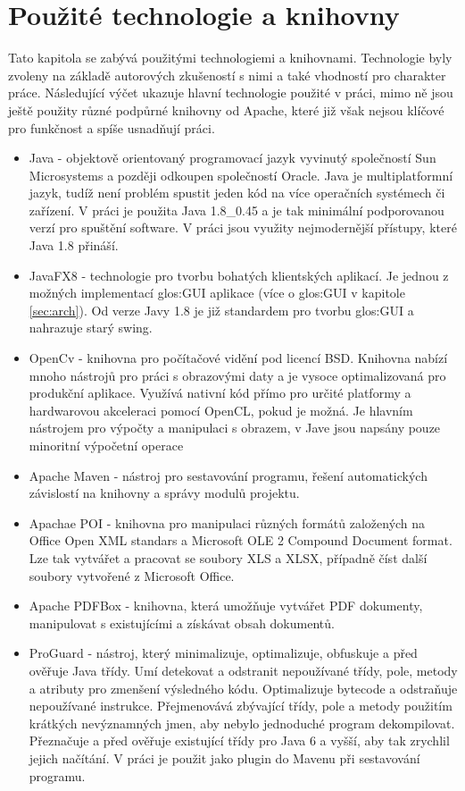 \section{Použité technologie a knihovny}
Tato kapitola se zabývá použitými technologiemi a knihovnami. Technologie byly zvoleny na základě autorových zkušeností s nimi a také vhodností pro charakter práce. Následující výčet ukazuje hlavní technologie použité v práci, mimo ně jsou ještě použity různé podpůrné knihovny od Apache, které již však nejsou klíčové pro funkčnost a spíše usnadňují práci.
\begin{itemize}
	\item Java - objektově orientovaný programovací jazyk vyvinutý společností Sun Microsystems a později odkoupen společností Oracle. Java je multiplatformní jazyk, tudíž není problém spustit jeden kód na více operačních systémech či zařízení. V práci je použita Java 1.8\_0.45 a je tak minimální podporovanou verzí pro spuštění software. V práci jsou využity nejmodernější přístupy, které Java 1.8 přináší.
	\item JavaFX8 - technologie pro tvorbu bohatých klientských aplikací. Je jednou z možných implementací \gls{glos:GUI} aplikace (více o \gls{glos:GUI} v kapitole \ref{sec:arch}). Od verze Javy 1.8 je již standardem pro tvorbu \gls{glos:GUI} a nahrazuje starý swing.
	\item OpenCv - knihovna pro počítačové vidění pod licencí BSD. Knihovna nabízí mnoho nástrojů pro práci s obrazovými daty a je vysoce optimalizovaná pro produkční aplikace. Využívá nativní kód přímo pro určité platformy a hardwarovou akceleraci pomocí OpenCL, pokud je možná. Je hlavním nástrojem pro výpočty a manipulaci s obrazem, v Jave jsou napsány pouze minoritní výpočetní operace\cite{learning}
	\item Apache Maven - nástroj pro sestavování programu, řešení automatických závislostí na knihovny a správy modulů projektu.\cite{maven}
	\item Apachae POI - knihovna pro manipulaci různých formátů založených na Office Open XML standars a Microsoft OLE 2 Compound Document format. Lze tak vytvářet a pracovat se soubory XLS a XLSX, případně číst další soubory vytvořené z Microsoft Office.\cite{apache-1}
	\item Apache PDFBox - knihovna, která umožňuje vytvářet PDF dokumenty, manipulovat s existujícími a získávat obsah dokumentů.\cite{apache-2}
	\item ProGuard - nástroj, který minimalizuje, optimalizuje, obfuskuje a před ověřuje Java třídy. Umí detekovat a odstranit nepoužívané třídy, pole, metody a atributy pro zmenšení výsledného kódu. Optimalizuje bytecode a odstraňuje nepoužívané instrukce. Přejmenovává zbývající třídy, pole a metody použitím krátkých nevýznamných jmen, aby nebylo jednoduché program dekompilovat. Přeznačuje a před ověřuje existující třídy pro Java 6 a vyšší, aby tak zrychlil jejich načítání.\cite{proguard} V práci je použit jako plugin do Mavenu při sestavování programu.

\end{itemize}
